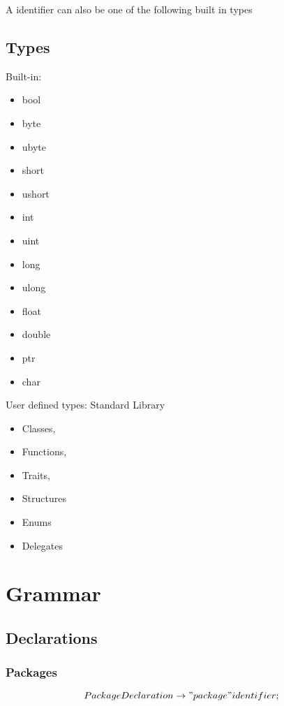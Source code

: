 \documentclass[a4paper]{article}
\begin{document}
A identifier can also be one of the following built in types
\subsection{Types}
Built-in:

\begin{multicols}{4}
\begin{itemize}
\item bool 
\item byte 
\item ubyte 
\item short 
\item ushort 
\item int 
\item uint 
\item long 
\item ulong 
\item float 
\item double 
\item ptr 
\item char 
\end{itemize}
\end{multicols}


User defined types:
Standard Library
\begin{itemize}
\item Classes, 
\item Functions, 
\item Traits, 
\item Structures
\item Enums
\item Delegates

\end{itemize}

\section{Grammar}

\subsection{Declarations}

\subsubsection*{Packages}
\[PackageDeclaration \rightarrow "package" identifier;\]
\end{document}
